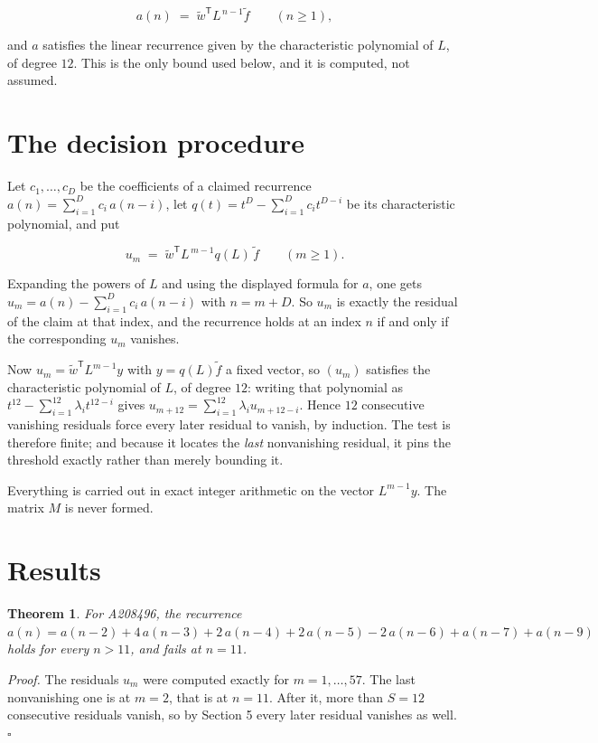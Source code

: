 \documentclass[11pt]{article}
\newtheorem{theorem}{Theorem}
\theoremstyle{definition}
\begin{document}
\[a(n) \;=\; \tilde w^{\mathsf T} L^{\,n-1} \tilde f \qquad (n \ge 1),\]

and $a$ satisfies the linear recurrence given by the characteristic polynomial of $L$, of degree $12$. This is the only bound used below, and it is computed, not assumed.

\section{The decision procedure}

Let $c_1,\dots,c_D$ be the coefficients of a claimed recurrence $a(n) = \sum_{i=1}^{D} c_i\,a(n-i)$, let $q(t) = t^{D} - \sum_{i=1}^{D} c_i t^{D-i}$ be its characteristic polynomial, and put

\[u_m \;=\; \tilde w^{\mathsf T} L^{\,m-1} q(L)\,\tilde f \qquad (m \ge 1).\]

Expanding the powers of $L$ and using the displayed formula for $a$, one gets $u_m = a(n) - \sum_{i=1}^{D} c_i\,a(n-i)$ with $n = m + D$. So $u_m$ is exactly the residual of the claim at that index, and the recurrence holds at an index $n$ if and only if the corresponding $u_m$ vanishes.

Now $u_m = \tilde w^{\mathsf T} L^{m-1} y$ with $y = q(L)\tilde f$ a fixed vector, so $(u_m)$ satisfies the characteristic polynomial of $L$, of degree $12$: writing that polynomial as $t^{12} - \sum_{i=1}^{12} \lambda_i t^{12-i}$ gives $u_{m+12} = \sum_{i=1}^{12} \lambda_i u_{m+12-i}$. Hence $12$ consecutive vanishing residuals force every later residual to vanish, by induction. The test is therefore finite; and because it locates the {\itshape last} nonvanishing residual, it pins the threshold exactly rather than merely bounding it.

Everything is carried out in exact integer arithmetic on the vector $L^{m-1}y$. The matrix $M$ is never formed.

\section{Results}

\begin{theorem} For A208496, the recurrence $a(n) = a(n-2) + 4\,a(n-3) + 2\,a(n-4) + 2\,a(n-5) - 2\,a(n-6) + a(n-7) + a(n-9)$ holds for every $n > 11$, and fails at $n = 11$.\end{theorem}

{\itshape Proof.} The residuals $u_m$ were computed exactly for $m = 1,\dots,57$. The last nonvanishing one is at $m = 2$, that is at $n = 11$. After it, more than $S = 12$ consecutive residuals vanish, so by Section 5 every later residual vanishes as well. $\square$
\end{document}
